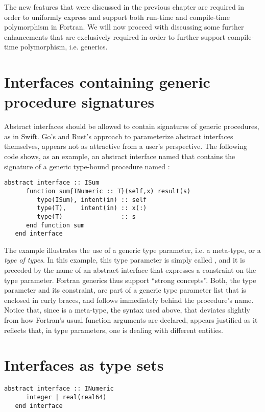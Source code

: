 \documentclass[11pt,oneside]{report}
\newcommand{\code}[1]{{\selectfont\ttfamily{#1}}}
\begin{document}
The new features that were discussed in the previous chapter are
required in order to uniformly express and support both run-time and
compile-time polymorphism in Fortran. We will now proceed with
discussing some further enhancements that are exclusively required in
order to further support compile-time polymorphism, i.e. generics.

\section{Interfaces containing generic procedure signatures}
\label{sect:generic_interfaces}

Abstract interfaces should be allowed to contain signatures of generic
procedures, as in Swift. Go's and Rust's approach to parameterize
abstract interfaces themselves, appears not as attractive from a
user's perspective. The following code shows, as an example, an
abstract interface named \code{ISum} that contains the signature of a
generic type-bound procedure named \code{sum}:
\begin{lstlisting}[language=LFortran,style=boxed]
   abstract interface :: ISum
      function sum{INumeric :: T}(self,x) result(s)
         type(ISum), intent(in) :: self
         type(T),    intent(in) :: x(:)
         type(T)                :: s
      end function sum
   end interface
\end{lstlisting}

The example illustrates the use of a generic type parameter, i.e.  a
meta-type, or a \emph{type of types}. In this example, this type
parameter is simply called \code{T}, and it is preceded by the name of
an abstract interface that expresses a constraint on the type
parameter. Fortran generics thus support ``strong concepts''. Both,
the type parameter and its constraint, are part of a generic type
parameter list that is enclosed in curly braces, and follows
immediately behind the procedure's name. Notice that, since \code{T}
is a meta-type, the syntax used above, that deviates slightly from how
Fortran's usual function arguments are declared, appears justified as
it reflects that, in type parameters, one is dealing with different
entities.

\section{Interfaces as type sets}

\begin{lstlisting}[language=LFortran,style=boxed]
   abstract interface :: INumeric
      integer | real(real64)
   end interface
\end{lstlisting}
\end{document}
